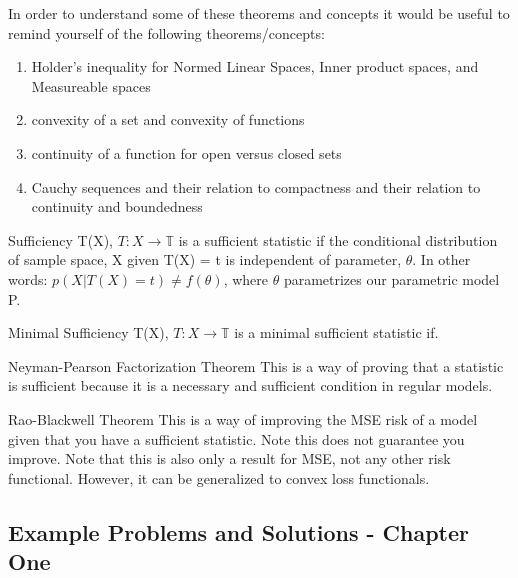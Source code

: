     In order to understand some of these theorems and concepts it would be useful to remind yourself of the following theorems/concepts:

    \begin{enumerate}
      \item Holder's inequality for Normed Linear Spaces, Inner product spaces, and Measureable spaces
      \item convexity of a set and convexity of functions
      \item continuity of a function for open versus closed sets
      \item Cauchy sequences and their relation to compactness and their relation to continuity and boundedness
    \end{enumerate}

    \begin{definition}{Sufficiency}
    T(X), $T: X \rightarrow \mathbb{T}$ is a sufficient statistic if the conditional distribution of sample space, X given T(X) = t is independent of parameter, $\theta$. In other words: $p(X | T(X) = t) \neq f(\theta)$, where $\theta$ parametrizes our parametric model P. 
    \end{definition}

    \begin{definition}{Minimal Sufficiency}
    T(X), $T: X \rightarrow \mathbb{T}$ is a minimal sufficient statistic if.
    \end{definition}

    \begin{theorem}{Neyman-Pearson Factorization Theorem}
    This is a way of proving that a statistic is sufficient because it is a necessary and sufficient condition in regular models.
    \end{theorem}

    \begin{theorem}{Rao-Blackwell Theorem}
    This is a way of improving the MSE risk of a model given that you have a sufficient statistic. Note this does not guarantee you improve. Note that this is also only a result for MSE, not any other risk functional. However, it can be generalized to convex loss functionals.
    \end{theorem}

  \subsection{Example Problems and Solutions - Chapter One}

